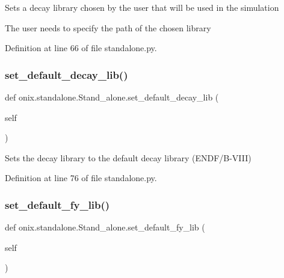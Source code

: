 \begin{DoxyVerb}Sets a decay library chosen by the user that will be used in the simulation

The user needs to specify the path of the chosen library\end{DoxyVerb}
 

Definition at line 66 of file standalone.\+py.

\mbox{\label{classonix_1_1standalone_1_1Stand__alone_aeac69ab322ac6f76315302cef654a577}} 
\subsubsection{\texorpdfstring{set\+\_\+default\+\_\+decay\+\_\+lib()}{set\_default\_decay\_lib()}}
{\footnotesize\ttfamily def onix.\+standalone.\+Stand\+\_\+alone.\+set\+\_\+default\+\_\+decay\+\_\+lib (\begin{DoxyParamCaption}\item[{}]{self }\end{DoxyParamCaption})}

\begin{DoxyVerb}Sets the decay library to the default decay library (ENDF/B-VIII)\end{DoxyVerb}
 

Definition at line 76 of file standalone.\+py.

\mbox{\label{classonix_1_1standalone_1_1Stand__alone_aba201eccf868c3c58dbd3c2c41cbcdaa}} 
\subsubsection{\texorpdfstring{set\+\_\+default\+\_\+fy\+\_\+lib()}{set\_default\_fy\_lib()}}
{\footnotesize\ttfamily def onix.\+standalone.\+Stand\+\_\+alone.\+set\+\_\+default\+\_\+fy\+\_\+lib (\begin{DoxyParamCaption}\item[{}]{self }\end{DoxyParamCaption})}

